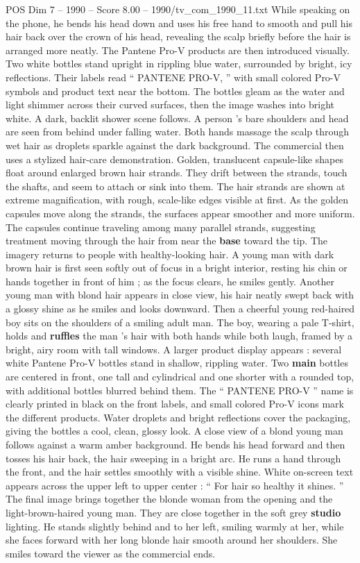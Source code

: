 \begin{textsample}{POS Dim 7 – 1990 – Score 8.00 – 1990/tv\_com\_1990\_11.txt}
While speaking on the phone, he bends his head down and uses his free hand to smooth and pull his hair back over the crown of his head, revealing the scalp briefly before the hair is arranged more neatly.
The Pantene Pro-V products are then introduced visually.
Two white bottles stand upright in rippling blue water, surrounded by bright, icy reflections.
Their labels read “ PANTENE PRO-V, ” with small colored Pro-V symbols and product text near the bottom.
The bottles gleam as the water and light shimmer across their curved surfaces, then the image washes into bright white.
A dark, backlit shower scene follows.
A person ’s bare shoulders and head are seen from behind under falling water.
Both hands massage the scalp through wet hair as droplets sparkle against the dark background.
The commercial then uses a stylized hair-care demonstration.
Golden, translucent capsule-like shapes float around enlarged brown hair strands.
They drift between the strands, touch the shafts, and seem to attach or sink into them.
The hair strands are shown at extreme magnification, with rough, scale-like edges visible at first.
As the golden capsules move along the strands, the surfaces appear smoother and more uniform.
The capsules continue traveling among many parallel strands, suggesting treatment moving through the hair from near the \textbf{base} toward the tip.
The imagery returns to people with healthy-looking hair.
A young man with dark brown hair is first seen softly out of focus in a bright interior, resting his chin or hands together in front of him ; as the focus clears, he smiles gently.
Another young man with blond hair appears in close view, his hair neatly swept back with a glossy shine as he smiles and looks downward.
Then a cheerful young red-haired boy sits on the shoulders of a smiling adult man.
The boy, wearing a pale T-shirt, holds and \textbf{ruffles} the man ’s hair with both hands while both laugh, framed by a bright, airy room with tall windows.
A larger product display appears : several white Pantene Pro-V bottles stand in shallow, rippling water.
Two \textbf{main} bottles are centered in front, one tall and cylindrical and one shorter with a rounded top, with additional bottles blurred behind them.
The “ PANTENE PRO-V ” name is clearly printed in black on the front labels, and small colored Pro-V icons mark the different products.
Water droplets and bright reflections cover the packaging, giving the bottles a cool, clean, glossy look.
A close view of a blond young man follows against a warm amber background.
He bends his head forward and then tosses his hair back, the hair sweeping in a bright arc.
He runs a hand through the front, and the hair settles smoothly with a visible shine.
White on-screen text appears across the upper left to upper center : “ For hair so healthy it shines. ” The final image brings together the blonde woman from the opening and the light-brown-haired young man.
They are close together in the soft grey \textbf{studio} lighting.
He stands slightly behind and to her left, smiling warmly at her, while she faces forward with her long blonde hair smooth around her shoulders.
She smiles toward the viewer as the commercial ends.


\end{textsample}
